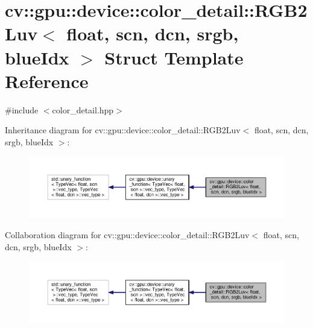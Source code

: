 \hypertarget{structcv_1_1gpu_1_1device_1_1color__detail_1_1RGB2Luv_3_01float_00_01scn_00_01dcn_00_01srgb_00_01blueIdx_01_4}{\section{cv\-:\-:gpu\-:\-:device\-:\-:color\-\_\-detail\-:\-:R\-G\-B2\-Luv$<$ float, scn, dcn, srgb, blue\-Idx $>$ Struct Template Reference}
\label{structcv_1_1gpu_1_1device_1_1color__detail_1_1RGB2Luv_3_01float_00_01scn_00_01dcn_00_01srgb_00_01blueIdx_01_4}
}


{\ttfamily \#include $<$color\-\_\-detail.\-hpp$>$}



Inheritance diagram for cv\-:\-:gpu\-:\-:device\-:\-:color\-\_\-detail\-:\-:R\-G\-B2\-Luv$<$ float, scn, dcn, srgb, blue\-Idx $>$\-:\nopagebreak
\begin{figure}[H]
\begin{center}
\leavevmode
\includegraphics[width=350pt]{structcv_1_1gpu_1_1device_1_1color__detail_1_1RGB2Luv_3_01float_00_01scn_00_01dcn_00_01srgb_00_01blueIdx_01_4__inherit__graph}
\end{center}
\end{figure}


Collaboration diagram for cv\-:\-:gpu\-:\-:device\-:\-:color\-\_\-detail\-:\-:R\-G\-B2\-Luv$<$ float, scn, dcn, srgb, blue\-Idx $>$\-:\nopagebreak
\begin{figure}[H]
\begin{center}
\leavevmode
\includegraphics[width=350pt]{structcv_1_1gpu_1_1device_1_1color__detail_1_1RGB2Luv_3_01float_00_01scn_00_01dcn_00_01srgb_00_01blueIdx_01_4__coll__graph}
\end{center}
\end{figure}
